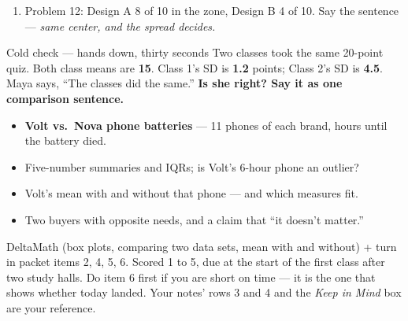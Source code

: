 \documentclass[aspectratio=169, 11pt]{beamer}
\begin{document}
\begin{frame}[t, plain]
  \vspace{4pt}
  \begin{enumerate}\setlength{\itemsep}{5pt}
    \item Problem 12: Design A 8 of 10 in the zone, Design B 4 of 10. Say the sentence ---
          \emph{same center, and the spread decides.}
  \end{enumerate}
  \vspace{6pt}
  \begin{block}{Cold check --- hands down, thirty seconds}
    Two classes took the same 20-point quiz. Both class means are \textbf{15}. Class 1's SD
    is \textbf{1.2} points; Class 2's SD is \textbf{4.5}. Maya says, ``The classes did the
    same.'' \textbf{Is she right? Say it as one comparison sentence.}
  \end{block}
\end{frame}

\begin{frame}[t, plain]
  \begin{itemize}\setlength{\itemsep}{5pt}
    \item \textbf{Volt vs.\ Nova phone batteries} --- 11 phones of each brand, hours until
          the battery died.
    \item Five-number summaries and IQRs; is Volt's 6-hour phone an outlier?
    \item Volt's mean with and without that phone --- and which measures fit.
    \item Two buyers with opposite needs, and a claim that ``it doesn't matter.''
  \end{itemize}
  \begin{block}{DeltaMath (box plots, comparing two data sets, mean with and without) + turn in packet items 2, 4, 5, 6. Scored 1 to 5, due at the start of the first class after two study halls.}
    Do item 6 first if you are short on time --- it is the one that shows whether today
    landed. Your notes' rows 3 and 4 and the \emph{Keep in Mind} box are your reference.
  \end{block}
\end{frame}
\end{document}
